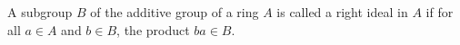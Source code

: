 A subgroup $B$ of the additive group of a ring $A$ is called a right ideal in $A$ if for all $a \in A$ and $b \in B$, the product $ba \in B$.